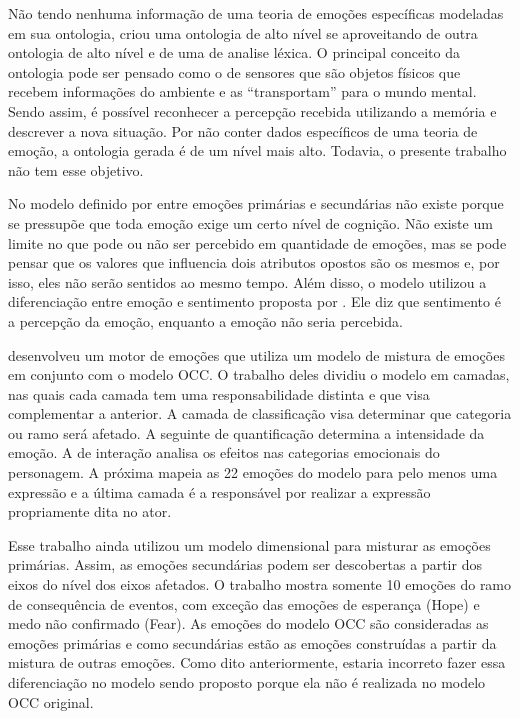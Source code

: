Não tendo nenhuma informação de uma teoria de emoções específicas modeladas em
sua ontologia, \citet{wks2008towards} criou uma ontologia de alto nível se
aproveitando de outra ontologia de alto nível e de uma de analise léxica. O
principal conceito da ontologia pode ser pensado como o de sensores que são
objetos físicos que recebem informações do ambiente e as ``transportam'' para
o mundo mental. Sendo assim, é possível reconhecer a percepção recebida
utilizando a memória e descrever a nova situação. Por não conter dados
específicos de uma teoria de emoção, a ontologia gerada é de um nível mais
alto. Todavia, o presente trabalho não tem esse objetivo\dev{}.

No modelo definido por \citet{ortony1988cse} entre emoções primárias e
secundárias não existe porque se pressupõe que toda emoção exige um certo
nível de cognição. Não existe um limite no que pode ou não ser percebido em
quantidade de emoções, mas se pode pensar que os valores que influencia dois
atributos opostos são os mesmos e, por isso, eles não serão sentidos ao mesmo
tempo. Além disso, o modelo utilizou a diferenciação entre emoção e sentimento
proposta por \citet{damasio2004erro}. Ele diz que sentimento é a percepção da
emoção, enquanto a emoção não seria percebida.

\citet{springerlink:10.1007/978-3-642-01639-448} desenvolveu um motor de
emoções que utiliza um modelo de mistura de emoções em conjunto com o modelo
OCC. O trabalho deles dividiu o modelo em camadas, nas quais cada camada tem
uma responsabilidade distinta e que visa complementar a anterior. A
camada de classificação visa determinar que categoria ou ramo será afetado. A
seguinte de quantificação determina a intensidade da emoção. A de interação
analisa os efeitos nas categorias emocionais do personagem. A próxima mapeia
as 22 emoções do modelo para pelo menos uma expressão e a última camada é a
responsável por realizar a expressão propriamente dita no ator.

Esse trabalho ainda utilizou um modelo dimensional para misturar as emoções
primárias. Assim, as emoções secundárias podem ser descobertas a partir dos
eixos do nível dos eixos afetados. O trabalho mostra somente 10 emoções do
ramo de consequência de eventos, com exceção das emoções de esperança (Hope) e
medo não confirmado (Fear). As emoções do modelo OCC são consideradas as
emoções primárias e como secundárias estão as emoções construídas a partir da
mistura de outras emoções. Como dito anteriormente, estaria incorreto fazer
essa diferenciação no modelo sendo proposto porque ela não é realizada no
modelo OCC original.


